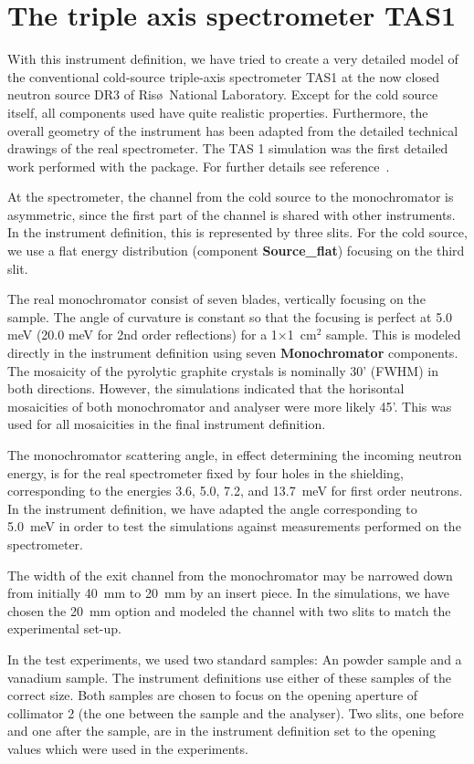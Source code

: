 \section{The triple axis spectrometer TAS1}
\label{s:TAS1}
With this instrument definition, we have tried to create
a very detailed model of the conventional cold-source
triple-axis spectrometer TAS1 at the now closed neutron source DR3 of
Ris\o\ National Laboratory.
Except for the cold source itself, all components
used have quite realistic properties. Furthermore, the overall
geometry of the instrument has been adapted from
the detailed technical drawings of the real spectrometer.
The TAS 1 simulation was the first detailed work
performed with the \MCS package.
For further details see reference~\cite{tas1_report}.

At the spectrometer, the channel from the cold source
to the monochromator is asymmetric, since the first
part of the channel is shared with other instruments.
In the instrument definition, this is represented by
three slits.
For the cold source, we use a flat energy
distribution (component {\bf Source\_flat})
focusing on the third slit.

The real monochromator consist of seven blades, vertically focusing on
the sample. The angle of curvature is constant so that the focusing is
perfect at 5.0 meV (20.0 meV for 2nd order reflections) for a 1$\times$1~cm$^2$
sample. This is modeled directly in the instrument definition using
seven {\bf Monochromator} components. The mosaicity of the pyrolytic
graphite crystals is nominally 30' (FWHM) in both directions.  However, the
simulations indicated that the horisontal mosaicities of both
monochromator and analyser were more likely 45'. This was used for all
mosaicities in the final instrument definition.

The monochromator scattering angle, in effect determining the incoming
neutron energy, is for the real spectrometer fixed by four holes in the
shielding, corresponding to the energies 3.6, 5.0, 7.2, and 13.7~meV for
first order neutrons.  In the instrument definition, we have adapted the
angle corresponding to 5.0~meV in order to test the simulations against
measurements performed on the spectrometer.

The width of the exit channel from the monochromator may
be narrowed down from initially 40~mm
to 20~mm by an insert piece. In the simulations, we have chosen
the 20~mm option and modeled the channel with two slits to match
the experimental set-up.

In the test experiments, we used two standard samples:
An  powder sample and a vanadium sample. The instrument
definitions use either of these samples of the correct
size. Both samples are chosen to focus on the opening aperture of
collimator 2 (the one between the sample and the analyser).
Two slits, one before and one after the sample,
are in the instrument definition set to the opening values which
were used in the experiments.

